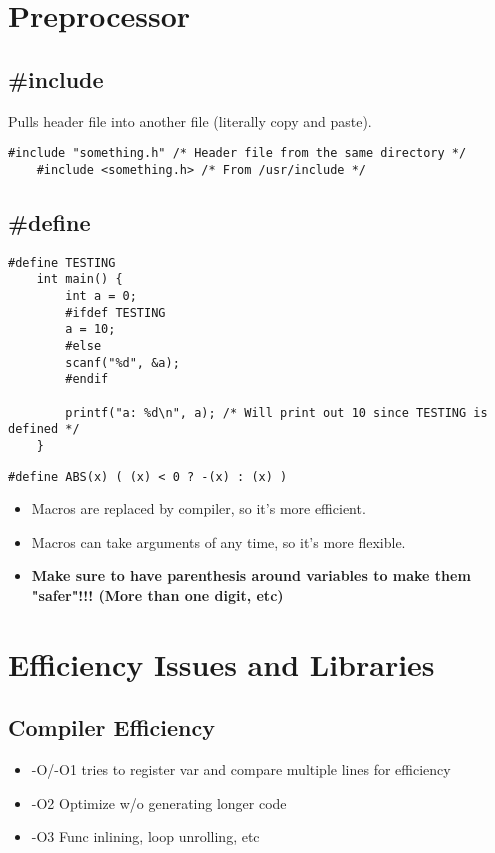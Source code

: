 \documentclass{article}
\begin{document}
\section{Preprocessor}

\subsection{\#include}
Pulls header file into another file (literally copy and paste).
\begin{lstlisting}[style=CStyle]
    #include "something.h" /* Header file from the same directory */
    #include <something.h> /* From /usr/include */
\end{lstlisting}

\subsection{\#define}
\begin{lstlisting}[style=CStyle]
    #define TESTING
    int main() {
        int a = 0;
        #ifdef TESTING
        a = 10;
        #else
        scanf("%d", &a);
        #endif

        printf("a: %d\n", a); /* Will print out 10 since TESTING is defined */
    }
\end{lstlisting}
\begin{lstlisting}[style=CStyle]
    #define ABS(x) ( (x) < 0 ? -(x) : (x) )
\end{lstlisting}
\begin{itemize}
    \item Macros are replaced by compiler, so it's more efficient.
    \item Macros can take arguments of any time, so it's more flexible.
    \item \textbf{Make sure to have parenthesis around variables to make them "safer"!!! (More than one digit, etc)}
\end{itemize}

\section{Efficiency Issues and Libraries}

\subsection{Compiler Efficiency}
\begin{itemize}
    \item -O/-O1 tries to register var and compare multiple lines for efficiency
    \item -O2 Optimize w/o generating longer code
    \item -O3 Func inlining, loop unrolling, etc
\end{itemize}
\end{document}
